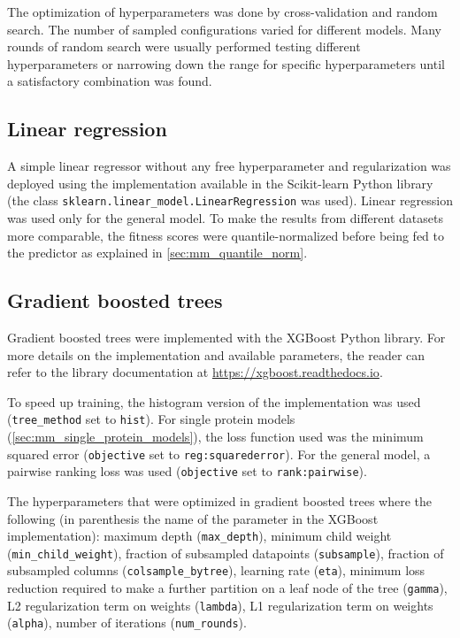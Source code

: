 The optimization of hyperparameters was done by cross-validation and random search.
The number of sampled configurations varied for different models.
Many rounds of random search were usually performed testing different hyperparameters or narrowing down the range for specific hyperparameters until a satisfactory combination was found.

\subsection{Linear regression}
A simple linear regressor without any free hyperparameter and regularization was deployed using the implementation available in the Scikit-learn Python library (the class \texttt{sklearn.linear\_model.LinearRegression} was used).
Linear regression was used only for the general model.
To make the results from different datasets more comparable, the fitness scores were quantile-normalized before being fed to the predictor as explained in \cref{sec:mm_quantile_norm}.

\subsection{Gradient boosted trees}
Gradient boosted trees were implemented with the XGBoost Python library.
For more details on the implementation and available parameters, the reader can refer to the library documentation at \url{https://xgboost.readthedocs.io}.

To speed up training, the histogram version of the implementation was used (\texttt{tree\_method} set to \texttt{hist}).
For single protein models (\cref{sec:mm_single_protein_models}), the loss function used was the minimum squared error (\texttt{objective} set to \texttt{reg:squarederror}).
For the general model, a pairwise ranking loss was used (\texttt{objective} set to \texttt{rank:pairwise}).

The hyperparameters that were optimized in gradient boosted trees where the following (in parenthesis the name of the parameter in the XGBoost implementation): maximum depth (\texttt{max\_depth}), minimum child weight (\texttt{min\_child\_weight}), fraction of subsampled datapoints (\texttt{subsample}), fraction of subsampled columns (\texttt{colsample\_bytree}), learning rate (\texttt{eta}), minimum loss reduction required to make a further partition on a leaf node of the tree (\texttt{gamma}), L2 regularization term on weights (\texttt{lambda}), L1 regularization term on weights (\texttt{alpha}), number of iterations (\texttt{num\_rounds}).


